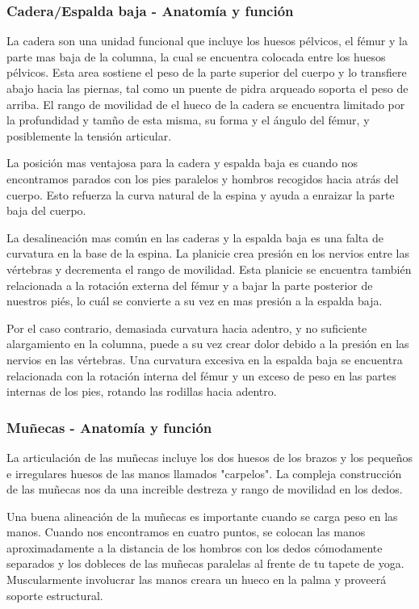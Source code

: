\subsubsection{Cadera/Espalda baja - Anatomía y función}
La cadera son una unidad funcional que incluye los huesos pélvicos, el fémur y la parte mas baja de la columna, la cual se encuentra colocada entre los huesos pélvicos. Esta area sostiene el peso de la parte superior del cuerpo y lo transfiere abajo hacia las piernas, tal como un puente de pidra arqueado soporta el peso de arriba. El rango de movilidad de el hueco de la cadera se encuentra limitado por la profundidad y tamño de esta misma, su forma y el ángulo del fémur, y posiblemente la tensión articular.

La posición mas ventajosa para la cadera y espalda baja es cuando nos encontramos parados con los pies paralelos y hombros recogidos hacia atrás del cuerpo. Esto refuerza la curva natural de la espina y ayuda a enraizar la parte baja del cuerpo.

La desalineación mas común en las caderas y la espalda baja es una falta de curvatura en la base de la espina. La planicie crea presión en los nervios entre las vértebras y decrementa el rango de movilidad. Esta planicie se encuentra también relacionada a la rotación externa del fémur y a bajar la parte posterior de nuestros piés, lo cuál se convierte a su vez en mas presión a la espalda baja.

Por el caso contrario, demasiada curvatura hacia adentro, y no suficiente alargamiento en la columna, puede a su vez crear dolor debido a la presión en las nervios en las vértebras. Una curvatura excesiva en la espalda baja se encuentra relacionada con la rotación interna del fémur y un exceso de peso en las partes internas de los pies, rotando las rodillas hacia adentro.

\subsubsection{Muñecas - Anatomía y función}
La articulación de las muñecas incluye los dos huesos de los brazos y los pequeños e irregulares huesos de las manos llamados "carpelos". La compleja construcción de las muñecas nos da una increible destreza y rango de movilidad en los dedos.

Una buena alineación de la muñecas es importante cuando se carga peso en las manos. Cuando nos encontramos en cuatro puntos, se colocan las manos aproximadamente a la distancia de los hombros con los dedos cómodamente separados y los dobleces de las muñecas paralelas al frente de tu tapete de yoga. Muscularmente involucrar las manos creara un hueco en la palma y proveerá soporte estructural.

